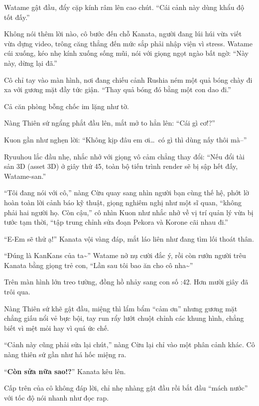 \documentclass[../main.tex]{subfiles}
\begin{document}
Watame gật đầu, đẩy cặp kính râm lên cao chút. ``Cái cảnh này dùng khẩu độ tốt đấy.''

Không nói thêm lời nào, cô bước đến chỗ Kanata, người đang lúi húi vừa viết vừa dựng video, trông căng thẳng đến mức sắp phải nhập viện vì stress. Watame cúi xuống, kéo nhẹ kính xuống sống mũi, nói với giọng ngọt ngào bất ngờ: ``Này này, dừng lại đã.''

Cô chỉ tay vào màn hình, nơi đang chiếu cảnh Rushia ném một quả bóng chày đi xa với gương mặt đầy tức giận. ``Thay quả bóng đó bằng một con dao đi.''

Cả căn phòng bỗng chốc im lặng như tờ.

Nàng Thiên sứ ngẩng phắt đầu lên, mắt mở to hẳn lên: ``Cái gì cơ!?''

Kuon gần như nghẹn lời: ``Không kịp đâu em ơi\dots\ có gì thì dùng nấy thôi mà--''

Ryuuhou lắc đầu nhẹ, nhắc nhở với giọng vô cảm chẳng thay đổi: ``Nếu đổi tài sản 3D (asset 3D) ở giây thứ 45, toàn bộ tiến trình render sẽ bị sập hết đấy, Watame-san.''

``Tôi đang nói với cô,'' nàng Cừu quay sang nhìn người bạn cùng thế hệ, phớt lờ hoàn toàn lời cảnh báo kỹ thuật, giọng nghiêm nghị như một sĩ quan, ``không phải hai người họ. Còn cậu,'' cô nhìn Kuon như nhắc nhở về vị trí quản lý vừa bị tước tạm thời, ``tập trung chỉnh sửa đoạn Pekora và Korone cãi nhau đi.''

``E-Em sẽ thử ạ!'' Kanata vội vàng đáp, mắt láo liên như đang tìm lối thoát thân.

``Đúng là KanKans của ta\~{}'' Watame nở nụ cười đắc ý, rồi còn rướn người trêu Kanata bằng giọng trẻ con, ``Lần sau tôi bao ăn cho cô nha\~{}''


Trên màn hình lớn treo tường, đồng hồ nhảy sang con số {:42}. Hơn mười giây đã trôi qua.

Nàng Thiên sứ khẽ gật đầu, miệng thì lẩm bẩm ``cảm ơn'' nhưng gương mặt chẳng giấu nổi vẻ bực bội, tay run rẩy lướt chuột chỉnh các khung hình, chẳng biết vì mệt mỏi hay vì quá ức chế.

``Cảnh này cũng phải sửa lại chút,'' nàng Cừu lại chỉ vào một phân cảnh khác. Cô nàng thiên sứ gần như há hốc miệng ra.

``\textbf{Còn sửa nữa sao!?}'' Kanata kêu lên.

Cấp trên của cô không đáp lời, chỉ nhẹ nhàng gật đầu rồi bắt đầu ``mách nước'' với tốc độ nói nhanh như đọc rap.
\end{document}
